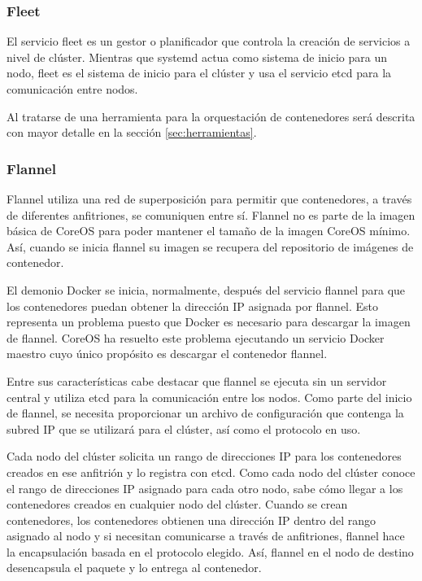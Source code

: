 \subsubsection{Fleet} \label{sssec:fleet}

El servicio fleet es un gestor o planificador que controla la creación de servicios a nivel de clúster. Mientras que systemd actua como sistema de inicio para un nodo, fleet es el sistema de inicio para el clúster y usa el servicio etcd para la comunicación entre nodos.

Al tratarse de una herramienta para la orquestación de contenedores será descrita con mayor detalle en la sección \ref{sec:herramientas}.

\subsubsection{Flannel}

Flannel utiliza una red de superposición para permitir que contenedores, a través de diferentes anfitriones, se comuniquen entre sí. Flannel no es parte de la imagen básica de CoreOS para poder mantener el tamaño de la imagen CoreOS mínimo. Así, cuando se inicia flannel su imagen se recupera del repositorio de imágenes de contenedor. 

El demonio Docker se inicia, normalmente, después del servicio flannel para que los contenedores puedan obtener la dirección IP asignada por flannel. Esto representa un problema puesto que Docker es necesario para descargar la imagen de flannel. CoreOS ha resuelto este problema ejecutando un servicio Docker maestro cuyo único propósito es descargar el contenedor flannel.

Entre sus características cabe destacar que flannel se ejecuta sin un servidor central y utiliza etcd para la comunicación entre los nodos. Como parte del inicio de flannel, se necesita proporcionar un archivo de configuración que contenga la subred IP que se utilizará para el clúster, así como el protocolo en uso.

Cada nodo del clúster solicita un rango de direcciones IP para los contenedores creados en ese anfitrión y lo registra con etcd. Como cada nodo del clúster conoce el rango de direcciones IP asignado para cada otro nodo, sabe cómo llegar a los contenedores creados en cualquier nodo del clúster. Cuando se crean contenedores, los contenedores obtienen una dirección IP dentro del rango asignado al nodo y si necesitan comunicarse a través de anfitriones, flannel hace la encapsulación basada en el protocolo elegido. Así, flannel en el nodo de destino desencapsula el paquete y lo entrega al contenedor.

